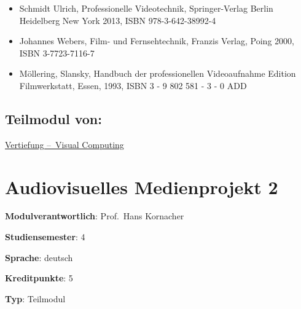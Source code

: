 \begin{itemize}
\tightlist
\item
  Schmidt Ulrich, Professionelle Videotechnik, Springer-Verlag Berlin
  Heidelberg New York 2013, ISBN 978-3-642-38992-4
\item
  Johannes Webers, Film- und Fernsehtechnik, Franzis Verlag, Poing 2000,
  ISBN 3-7723-7116-7
\item
  Möllering, Slansky, Handbuch der professionellen Videoaufnahme Edition
  Filmwerkstatt, Essen, 1993, ISBN 3 - 9 802 581 - 3 - 0 ADD
\end{itemize}

\hypertarget{teilmodul-vonpathlabelmi-2017modulbeschreibungen-bachelorba_vc-audiovisuelle-medientechnik}{%
\section*{Teilmodul
von:\label{/mi-2017/modulbeschreibungen-bachelor/BA_VC-audiovisuelle-medientechnik}}\label{teilmodul-vonpathlabelmi-2017modulbeschreibungen-bachelorba_vc-audiovisuelle-medientechnik}}

\hyperref[/mi-2017/modulbeschreibungen-bachelor/BA_Vertiefung-Visual-Computing]{Vertiefung – Visual Computing}

\hypertarget{audiovisuelles-medienprojekt-2pathlabelmi-2017modulbeschreibungen-bachelorba_vc-audiovisuelles-medienprojekt-2}{%
\chapter{Audiovisuelles Medienprojekt
2\label{/mi-2017/modulbeschreibungen-bachelor/BA_VC-audiovisuelles-medienprojekt-2}}\label{audiovisuelles-medienprojekt-2pathlabelmi-2017modulbeschreibungen-bachelorba_vc-audiovisuelles-medienprojekt-2}}

\begin{modulHead}
\textbf{Modulverantwortlich}: Prof.~Hans
Kornacher
\end{modulHead}
\begin{modulHead}
\textbf{Studiensemester}:
4
\end{modulHead}
\begin{modulHead}
\textbf{Sprache}:
deutsch
\end{modulHead}
\begin{modulHead}
\textbf{Kreditpunkte}:
5
\end{modulHead}
\begin{modulHead}
\textbf{Typ}:
Teilmodul
\end{modulHead}


